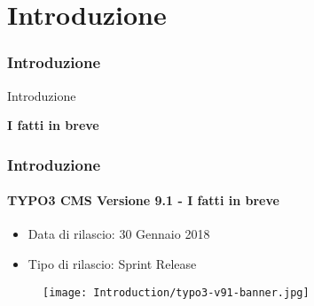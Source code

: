 %

\section{Introduzione}
\begin{frame}[fragile]
	\frametitle{Introduzione}

	\begin{center}\huge{Introduzione}\end{center}
	\begin{center}\huge{\color{typo3darkgrey}\textbf{I fatti in breve}}\end{center}

\end{frame}

\begin{frame}[fragile]
	\frametitle{Introduzione}
	\framesubtitle{TYPO3 CMS Versione 9.1 - I fatti in breve}

	\begin{itemize}
		\item Data di rilascio: 30 Gennaio 2018
		\item Tipo di rilascio: Sprint Release
	\end{itemize}

	\begin{figure}
		\texttt{[image: Introduction/typo3-v91-banner.jpg]}
	\end{figure}

\end{frame}

